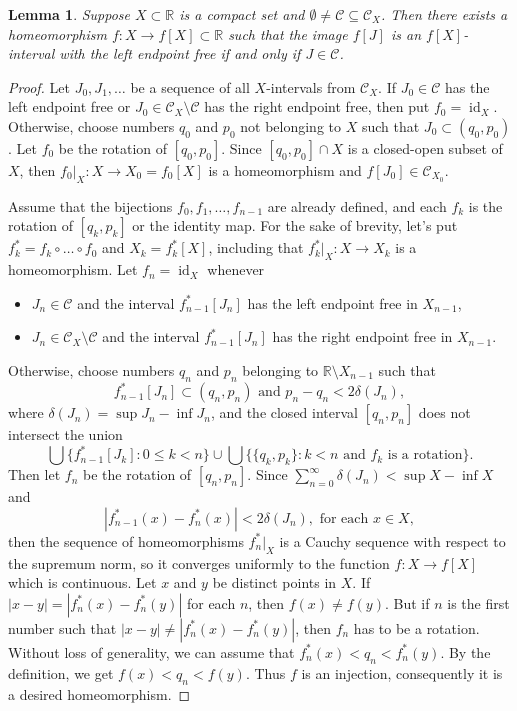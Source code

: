\documentclass[12pt,a4paper,leqno]{amsart}
\newcommand{\id}{\operatorname{id}}
\newtheorem{lem}[thm]{Lemma}
\theoremstyle{definition}
\begin{document}
\begin{lem}\label{le8} Suppose $X\subset \mathbb R$ is a compact set and $\emptyset \not= \mathcal C \subseteq \mathcal C_X$. Then there exists a homeomorphism $f\colon X \to f[X] \subset \mathbb R$ such that the image $f[J]$ is an $f[X]$-interval with the left endpoint free if and only if $J\in \mathcal C$.
\end{lem}
\begin{proof} Let $J_0, J_1, \ldots$ be a sequence of all $X$-intervals from $\mathcal C_X$.   
If  $J_0\in \mathcal C$ has the left endpoint free or $J_0\in \mathcal C_X \setminus \mathcal C$ has the right endpoint free, then put $f_0= \id_X$. 
Otherwise,  choose numbers $q_0$ and $p_0$ not belonging to $X$ such that $J_0 \subset  (q_0,p_0)$.   Let $f_0$ be the rotation of  $[q_0,p_0]$.
Since $[q_0,p_0]\cap X$ is a closed-open subset of $X$, then    $f_0|_X\colon X \to X_0=f_0[X]$ is a homeomorphism and $f[J_0]\in \mathcal C_{X_0}$.  

Assume that the bijections $f_0, f_1, \ldots, f_{n-1}$ are already defined, and each $f_k$ is the rotation of  $[q_k,p_k]$ or the identity map.
  For the sake of brevity, let's put $f_k^*=f_k \circ \ldots \circ f_0$ and $X_k=f_k^*[X]$, including that $f_k^*|_X \colon X \to X_k$ is a homeomorphism. Let $f_n= \id_X$ whenever 
\begin{itemize}
	\item[] $ J_n \in \mathcal C$ and the interval $f_{n-1}^*[J_n]$ has the left endpoint free in $X_{n-1}$, 
	\item[] $ J_n \in \mathcal C_X \setminus \mathcal C$ and the interval $f_{n-1}^*[J_n]$ has the right endpoint free in $X_{n-1}$.
\end{itemize}
  Otherwise, choose numbers $q_n$ and $p_n$  belonging to $\mathbb R\setminus X_{n-1}$ such that 
	$$f^*_{n-1}[J_n]\subset (q_n,p_n) \mbox{ and } p_n - q_n< 2\delta (J_n),$$ where $\delta (J_n)=\sup J_n -\inf J_n$,  and   the closed interval $[q_n,p_n]$ does not intersect the union 
$$\bigcup \{f^*_{n-1}[J_k]\colon 0\leq k <n\}\cup \bigcup \{\{ q_k,p_k\}\colon k<n \mbox{ and } f_k \mbox{ is a rotation} \}.$$  Then let $f_n$ be the rotation of  $[q_n,p_n]$.
 Since $\sum\limits^\infty_{n=0} \delta (J_n) < \sup X - \inf X$ and $$|f^*_{n-1}(x) - f^*_{n}(x)|<2\delta(J_n),  \mbox{ for each } x\in X, $$ then the sequence of homeomorphisms $f^*_n|_X$ is a Cauchy sequence with respect to  the supremum norm, so it converges uniformly to the  function $f\colon X \to f[X]$ which is continuous.
Let $x$ and $y$ be distinct points in $X$. If $|x-y| = |f^*_n(x) -f^*_n(y)|$ for each $n$, then $f(x)\not=f(y)$.  But if $n$ is the first number such that $|x-y| \not= |f^*_n(x) -f^*_n(y)|$, then $f_n$ has to be a rotation. Without loss of  generality, we can assume that $f^*_n(x) <q_n <f^*_n(y).$ By the definition, we get  
$f(x) <q_n <f(y).$ Thus $f$ is an injection, consequently it is a desired homeomorphism. 
\end{proof}
\end{document}
